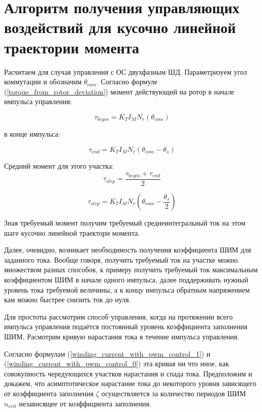 \newpage
\part{ Алгоритм получения управляющих воздействий для кусочно линейной траектории момента }

Расчитаем для случая управления с ОС двухфазным ШД. Параметризуем угол коммутации и обозначим
$\theta_{com}$.
Согласно формуле (\ref{torque_from_rotor_deviation}) момент действующий на ротор в начале импульса
управления:

\begin{equation}
    \label{moment_to_rotor_at_the_begin_of_control_pulse}    
    \tau_{begin} = K_{T} I_{M} N_{r} ( \theta_{com} )
\end{equation}

в конце импульса:

\begin{equation}
    \label{moment_to_rotor_at_the_end_of_control_pulse}    
    \tau_{end} = K_{T} I_{M} N_{r} ( \theta_{com} - \theta_{s} )
\end{equation}

Средний момент для этого участка:
$$
    \tau_{step} = \frac{ \tau_{begin} + \tau_{end} }{ 2 }
$$

$$
    \tau_{step} = K_{T} I_{M} N_{r} ( \theta_{com} - \frac{ \theta_{s} }{ 2 } )
$$

Зная требуемый момент получим требуемый среднеинтегральный ток на этом шаге кусочно линейной
траектори момента. 

Далее, очевидно, возникает необходимость получения коэффициента ШИМ для заданного тока. Вообще
говоря, получить требуемый ток на участке можно множеством разных способов, к примеру получить требуемый ток
максимальным коэффициентом ШИМ в начале одного импульса, далее поддерживать нужный уровень тока
требуемой величины, а к концу импульса обратным напряжением кам можно быстрее снизить ток до нуля.

Для простоты рассмотрим способ управления, когда на протяжении всего импульса управления подаётся постоянный
уровень коэффициента заполнения ШИМ. Расмотрим кривую нарастания тока в течение импульса управления.

Согласно формулам (\ref{winding_current_with_pwm_control_1}) 
и (\ref{winding_current_with_pwm_control_0}) эта кривая ни что иное, как совокупность чередующихся
участков нарастания и спада тока. Предположим и докажем, что асимптотическое нарастание тока до
некоторого уровня зависящего от коэффициента заполнения $\zeta$ осуществляется за количество периодов ШИМ
$n_{crit}$ независящее от коэффициента заполнения. 

